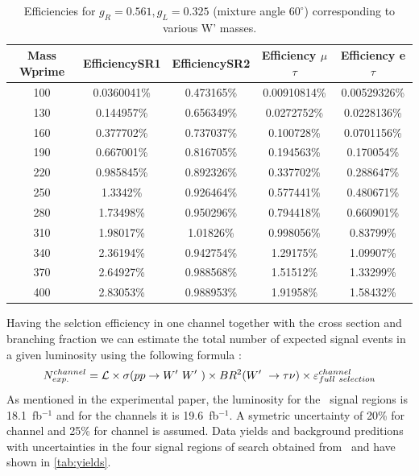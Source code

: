  \begin{table}[htb]
 	\centering
  	\begin{tabular}{|ccccc|}
  		\hline 
  		Mass Wprime & EfficiencySR1 & EfficiencySR2 & Efficiency $\mu$$\tau$ & Efficiency e $\tau$ \\
\hline 
  		100&0.0360041\%&0.473165\%&0.00910814\%&0.00529326\%\\
        	130& 0.144957\%& 0.656349\%&0.0272752\%& 0.0228136\%\\
        	160&0.377702\%&0.737037\%&0.100728\%&0.0701156\%\\
          	190& 0.667001\%& 0.816705\%& 0.194563\%& 0.170054\%\\
                220&0.985845\%&0.892326\%&0.337702\%&0.288647\%\\
                250&1.3342\%&0.926464\%&0.577441\%&0.480671\%\\ 
          	280& 1.73498\%& 0.950296\%& 0.794418\%& 0.660901\%\\
                310&1.98017\%&1.01826\%&0.998056\%&0.83799\%\\
                340& 2.36194\%& 0.942754\%& 1.29175\%& 1.09907\%\\ 
                370& 2.64927\%& 0.988568\%& 1.51512\%& 1.33299\%\\
        	400&2.83053\%&0.988953\%&1.91958\%&1.58432\%\\

  		\hline
  	\end{tabular}
  	\caption{Efficiencies for  $ g_R=0.561 , g_L=0.325$  (mixture angle $60^\circ$) corresponding to various W' masses. \label{eff-mix60} }
  \end{table}


 
Having the selction efficiency in one channel together with the cross section and branching fraction we can estimate the total number of expected signal events in a given luminosity using the following formula :
\begin{equation}
N^{channel}_{exp.}= \mathcal{L} \times \sigma(pp \to W^\prime~W^\prime~) \times BR^{2}(W^\prime~ \to \tau \nu) \times \varepsilon^{channel}_{full~selection}
\end{equation}
As mentioned in the experimental paper, the luminosity for the \tauTau ~signal regions is 18.1~fb$^{-1}$ and for the \lepTau channels it is 19.6~fb$^{-1}$. A symetric uncertainty of 20\% for \lepTau channel and 25\% for \tauTau channel is assumed. Data yields and background preditions with uncertainties in the four signal regions of search obtained from~\cite{Khachatryan:2016trj} and have shown in \ref{tab:yields}. 

